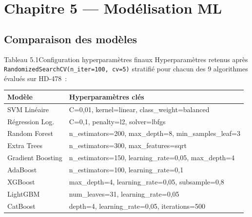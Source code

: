 \documentclass[12pt,a4paper]{article}
\begin{document}
\section{Chapitre 5 --- Modélisation ML}

\subsection{Comparaison des modèles}

\begin{figbox}{Tableau 5.1}{Configuration hyperparamètres finaux}
Hyperparamètres retenus après \texttt{RandomizedSearchCV(n\_iter=100, cv=5)}
stratifié pour chacun des 9 algorithmes évalués sur HD-478~:
\begin{center}
\small
\begin{tabular}{ll}
\toprule
\textbf{Modèle} & \textbf{Hyperparamètres clés} \\
\midrule
SVM Linéaire & C=0{,}01, kernel=linear, class\_weight=balanced \\
Régression Log. & C=0{,}1, penalty=l2, solver=lbfgs \\
Random Forest & n\_estimators=200, max\_depth=8, min\_samples\_leaf=3 \\
Extra Trees & n\_estimators=300, max\_features=sqrt \\
Gradient Boosting & n\_estimators=150, learning\_rate=0{,}05, max\_depth=4 \\
AdaBoost & n\_estimators=100, learning\_rate=0{,}1 \\
XGBoost & max\_depth=4, learning\_rate=0{,}05, subsample=0{,}8 \\
LightGBM & num\_leaves=31, learning\_rate=0{,}05 \\
CatBoost & depth=4, learning\_rate=0{,}05, iterations=500 \\
\bottomrule
\end{tabular}
\end{center}
\end{figbox}
\end{document}
